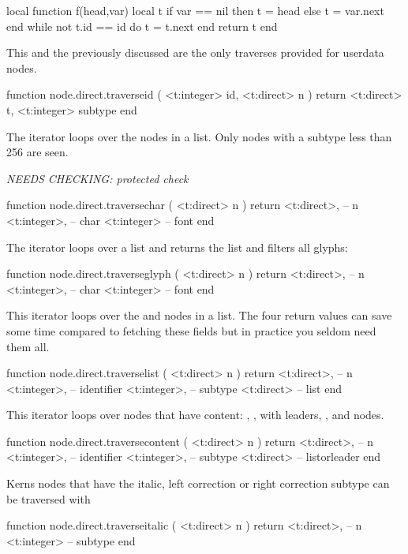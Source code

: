 \starttyping[option=LUA]
local function f(head,var)
    local t
    if var == nil then
        t = head
    else
        t = var.next
    end
    while not t.id == id do
        t = t.next
    end
    return t
end
\stoptyping

This and the previously discussed  are the only traverses
provided for userdata nodes.

\starttyping[option=LUA]
function node.direct.traverseid ( <t:integer> id, <t:direct> n )
    return
        <t:direct>  t,
        <t:integer> subtype
end
\stoptyping

The  iterator loops over the  nodes in a list.
Only nodes with a subtype less than 256 are seen.

{\em NEEDS CHECKING: protected check}

\starttyping[option=LUA]
function node.direct.traversechar ( <t:direct> n )
    return
        <t:direct>,  -- n
        <t:integer>, -- char
        <t:integer>  -- font
end
\stoptyping

The  iterator loops over a list and returns the list and
filters all glyphs:

\starttyping[option=LUA]
function node.direct.traverseglyph ( <t:direct> n )
    return
        <t:direct>,  -- n
        <t:integer>, -- char
        <t:integer>  -- font
end
\stoptyping

This iterator loops over the  and  nodes in a list. The
four return values can save some time compared to fetching these fields but in
practice you seldom need them all.

\starttyping[option=LUA]
function node.direct.traverselist ( <t:direct> n )
    return
        <t:direct>,  -- n
        <t:integer>, -- identifier
        <t:integer>, -- subtype
        <t:direct>   -- list
end
\stoptyping

This iterator loops over nodes that have content: , ,
 with leaders, ,  and  nodes.

\starttyping[option=LUA]
function node.direct.traversecontent ( <t:direct> n )
    return
        <t:direct>,  -- n
        <t:integer>, -- identifier
        <t:integer>, -- subtype
        <t:direct>   -- listorleader
end
\stoptyping

Kerns nodes that have the italic, left correction or right correction subtype can
be traversed with

\starttyping[option=LUA]
function node.direct.traverseitalic ( <t:direct> n )
    return
        <t:direct>, -- n
        <t:integer> -- subtype
end
\stoptyping


